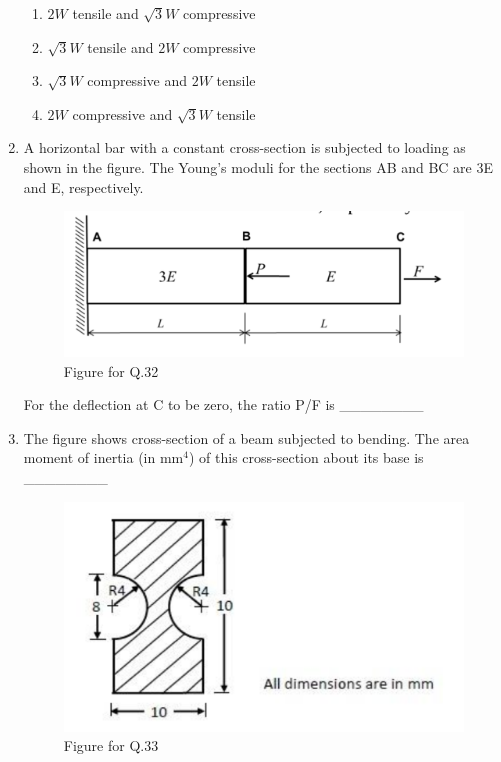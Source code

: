 \documentclass[journal,11pt,onecolumn]{IEEEtran}
\begin{document}
\begin{enumerate}[resume]
          \begin{enumerate}

              \item $2W$ tensile and $\sqrt{3}W$ compressive

              \item $\sqrt{3}W$ tensile and $2W$ compressive

              \item $\sqrt{3}W$ compressive and $2W$ tensile

              \item $2W$ compressive and $\sqrt{3}W$ tensile

          \end{enumerate}

    \item A horizontal bar with a constant cross-section is subjected to loading as shown in the figure. The Young's moduli for the sections AB and BC are 3E and E, respectively.

          \begin{figure}[H]
              \centering
              \includegraphics[scale=0.3]{q32}
              \caption{Figure for Q.32}
              \label{q32}
          \end{figure}

          For the deflection at C to be zero, the ratio P/F is \_\_\_\_\_\_\_\_

    \item The figure shows cross-section of a beam subjected to bending. The area moment of inertia (in mm$^4$) of this cross-section about its base is \_\_\_\_\_\_\_\_

          \begin{figure}[H]
              \centering
              \includegraphics[scale=0.2]{q33}
              \caption{Figure for Q.33}
              \label{q33}
          \end{figure}


\end{enumerate}
\end{document}

